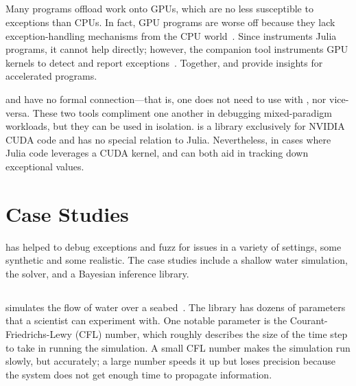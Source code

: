 \documentclass{juliacon}
\begin{document}
\subsection{\GPUFPX{}}
\label{s:gpufpx}

Many programs offload work onto GPUs, which are no less susceptible to \fp{} exceptions than CPUs.
In fact, GPU programs are worse off because they lack exception-handling mechanisms from the CPU world~\cite{llg-soap-2022}.
Since \TF{} instruments Julia programs, it cannot help directly;
however, the companion tool \GPUFPX{} instruments GPU kernels to detect and report
\fp{} exceptions~\cite{llsflg-hpdc-2023}.
Together, \TF{} and \GPUFPX{} provide insights for accelerated programs.

\TF{} and \GPUFPX{} have no formal connection---that is, one does not
need to use \GPUFPX{} with \TF{}, nor vice-versa.
These two tools compliment one another in debugging mixed-paradigm
workloads, but they can be used in isolation.
\GPUFPX{} is a library exclusively for NVIDIA CUDA code and has no
special relation to Julia.
Nevertheless, in cases where Julia code leverages a CUDA kernel,
\GPUFPX and \TF{} can both aid in tracking down exceptional \fp{}
values.


\section{Case Studies}
\label{s:casestudies}

\FlowFPX{} has helped to debug exceptions and fuzz for issues in a variety
of settings, some synthetic and some realistic.
The case studies include a shallow water simulation, the
\OrdinaryDiffEq{} solver, and a Bayesian inference library.

\subsection{\ShallowWaters{}}
\label{s:sw}

\ShallowWaters{} simulates the flow of water over a
seabed~\cite{klowerNumberFormatsError2020,klowerPositsAlternativeFloats2019}.
The library has dozens of parameters that a scientist can experiment with.
One notable parameter is the Courant-Friedrichs-Lewy (CFL) number, which roughly describes the size of the time step to take in running the simulation.
A small CFL number makes the simulation run slowly, but accurately; a large number speeds it up but loses precision
because the system does not get enough time to propagate information.
\end{document}
